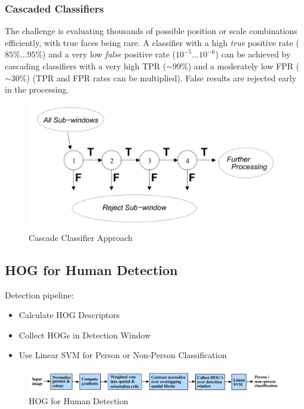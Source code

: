 \subsubsection{Cascaded Classifiers}
The challenge is evaluating thousands of possible position or scale combinations efficiently, with true faces being rare.
A classifier with a high \emph{true} positive rate ($85\%\ldots95\%$) and a very low \emph{false} positive rate ($10^{-5}\ldots10^{-6}$)
can be achieved by cascading classifiers with a very high TPR ($\sim$99\%) and a moderately low FPR ($\sim$30\%) (TPR and FPR rates can be multiplied).
False results are rejected early in the processing.

\begin{figure}[h]
	\centering
	\includegraphics[width=0.6\linewidth]{img/cascade_classifier_approach}
	\caption{Cascade Classifier Approach}
\end{figure}

\subsection{HOG for Human Detection}
Detection pipeline:
\begin{itemize}
	\item Calculate HOG Descriptors
	\item Collect HOGs in Detection Window
	\item Use Linear SVM for Person or Non-Person Classification
\end{itemize}

\begin{figure}[h]
	\centering
	\includegraphics[width=0.8\linewidth]{img/hog_human_detection}
	\caption{HOG for Human Detection}
\end{figure}

